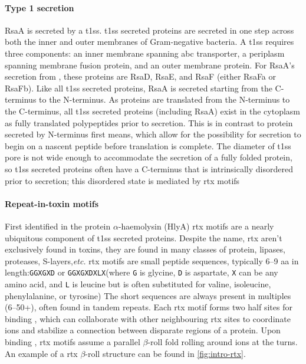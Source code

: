 \paragraph{Type 1 secretion} RsaA is secreted by a \ac{t1ss}. \Ac{t1ss} secreted proteins are secreted in one step across both the inner and outer membranes of Gram-negative bacteria. A \ac{t1ss} requires three components: an inner membrane spanning \ac{abc} transporter, a periplasm spanning membrane fusion protein, and an outer membrane protein. For RsaA's secretion from \caulobacter, these proteins are RsaD, RsaE, and RsaF (either RsaFa or RsaFb). Like all \ac{t1ss} secreted proteins, RsaA is secreted starting from the C-terminus to the N-terminus. As proteins are translated from the N-terminus to the C-terminus, all \ac{t1ss} secreted proteins (including RsaA) exist in the cytoplasm as fully translated polypeptides prior to secretion. This is in contrast to protein secreted by N-terminus first means, which allow for the possibility for secretion to begin on a nascent peptide before translation is complete. The diameter of \ac{t1ss} pore is not wide enough to accommodate the secretion of a fully folded protein, so \ac{t1ss} secreted proteins often have a C-terminus that is intrinsically disordered prior to secretion; this disordered state is mediated by \ac{rtx} motifs   


  \paragraph{Repeat-in-toxin motifs} First identified in the \ecoli protein $\alpha$-haemolysin (HlyA) \ac{rtx} motifs are a nearly ubiquitous component of \ac{t1ss} secreted proteins. Despite the name, \acl{rtx} aren't exclusively found in toxins, they are found in many classes of protein, lipases, proteases, S-layers,\textit{etc.}  \ac{rtx} motifs are small peptide sequences, typically 6--9 \ac{aa} in length:\texttt{GGXGXD} or \texttt{GGXGXDXLX}(where \texttt{G} is glycine, \texttt{D} is aspartate, \texttt{X} can be any amino acid, and \texttt{L} is leucine but is often substituted for valine, isoleucine, phenylalanine, or tyrosine) The short sequences are always present in multiples (6--50+), often found in tandem repeats. Each \ac{rtx} motif forms two half sites for binding , which can collaborate with other neighbouring \ac{rtx} sites to coordinate ions and stabilize a connection between disparate regions of a protein. Upon binding , \ac{rtx} motifs assume a parallel $\beta$-roll fold rolling around  ions at the turns. An example of a \ac{rtx} $\beta$-roll structure can be found in \cref{fig:intro-rtx}.

